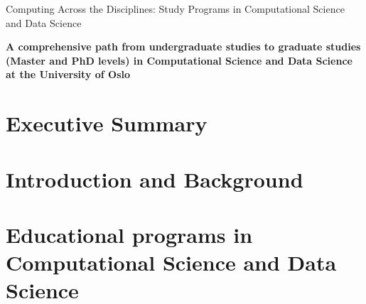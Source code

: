 \documentclass[oneside,final,10pt]{article}
\begin{document}
\thispagestyle{empty}

\begin{center}
{\LARGE\bf
\begin{spacing}{1.25}
Computing Across the Disciplines: Study Programs in Computational Science and Data Science
\end{spacing}
}
\end{center}

\begin{center}
{\bf A comprehensive path from undergraduate studies to graduate studies (Master and PhD levels) in Computational Science and Data Science at the University of Oslo }\\ [0mm]
\end{center}


\vspace{1cm}


\section*{Executive Summary}


\section*{Introduction and Background}




\section*{Educational programs in Computational Science and Data Science}
\end{document}
